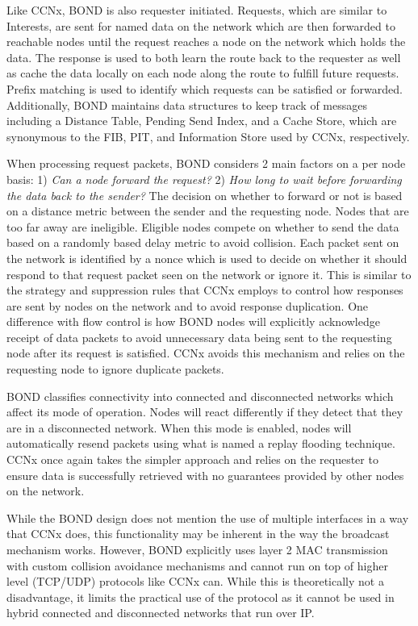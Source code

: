 \documentclass[a4paper,12pt]{report}      %
\begin{document}
Like CCNx, BOND is also requester initiated. Requests, which are similar to Interests, are sent
for named data on the network which are then forwarded to reachable nodes until the request reaches a
node on the network which holds the data. The response is used to both learn the route back to the
requester as well as cache the data locally on each node along the route to fulfill future requests. Prefix
matching is used to identify which requests can be satisfied or forwarded. Additionally, BOND
maintains data structures to keep track of messages including a Distance Table, Pending Send Index,
and a Cache Store, which are synonymous to the FIB, PIT, and Information Store used by CCNx,
respectively.

When processing request packets, BOND considers 2 main factors on a per node basis: 1) \textit{Can a
node forward the request?} 2) \textit{How long to wait before forwarding the data back to the sender?} The
decision on whether to forward or not is based on a distance metric between the sender and the
requesting node. Nodes that are too far away are ineligible. Eligible nodes compete on whether to send
the data based on a randomly based delay metric to avoid collision. Each packet sent on the network is
identified by a nonce which is used to decide on whether it should respond to that request packet seen
on the network or ignore it. This is similar to the strategy and suppression rules that CCNx employs to
control how responses are sent by nodes on the network and to avoid response duplication. One difference
with flow control is how BOND nodes will explicitly acknowledge receipt of data packets to avoid
unnecessary data being sent to the requesting node after its request is satisfied. CCNx avoids this
mechanism and relies on the requesting node to ignore duplicate packets.

BOND classifies connectivity into connected and disconnected networks which affect its mode
of operation. Nodes will react differently if they detect that they are in a disconnected network. When
this mode is enabled, nodes will automatically resend packets using what is named a replay flooding
technique. CCNx once again takes the simpler approach and relies on the requester to ensure data is
successfully retrieved with no guarantees provided by other nodes on the network.

While the BOND design does not mention the use of multiple interfaces in a way that CCNx
does, this functionality may be inherent in the way the broadcast mechanism works. However, BOND
explicitly uses layer 2 MAC transmission with custom collision avoidance mechanisms and cannot run
on top of higher level (TCP/UDP) protocols like CCNx can. While this is theoretically not a
disadvantage, it limits the practical use of the protocol as it cannot be used in hybrid connected and
disconnected networks that run over IP.
\end{document}
